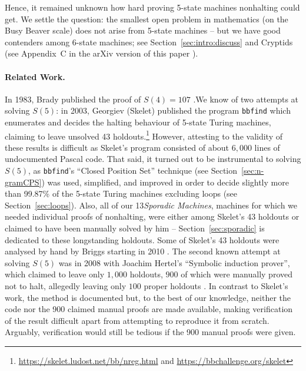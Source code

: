 \documentclass[sigconf,screen]{acmart}
\theoremstyle{definition} %
\numberwithin{equation}{section}
\theoremstyle{definition} %
\newcommand{\ts}[1]{{\color{red}#1}}
\newcommand{\BBtheFourth}{107}
\newcommand{\numSporadic}{13\xspace}
\begin{document}
\enlargethispage{\baselineskip}
Hence, it remained unknown how hard proving 5-state machines nonhalting could get. We settle the question: the smallest open problem in mathematics (on the Busy Beaver scale) does not arise from 5-state machines -- but we have good contenders among 6-state machines; see Section~\ref{sec:intro:discuss} and Cryptids (see Appendix~C in the arXiv version of this paper \cite{BB5}).

\newcommand{\SkeletHoldoutsSporadic}{\ts{XX}\xspace}

\paragraph{Related Work.} In 1983, Brady published the proof of $S(4) = \BBtheFourth$ \cite{Brady83}.We know of two attempts at solving $S(5)$: in 2003, Georgiev (Skelet) published the program \texttt{bbfind} \cite{Skelet_bbfind} which enumerates and decides the halting behaviour of 5-state Turing machines, claiming to leave unsolved 43 holdouts.\footnote{\url{https://skelet.ludost.net/bb/nreg.html} and \url{https://bbchallenge.org/skelet}} However, attesting to the validity of these results is difficult as Skelet's program consisted of about $6{,}000$ lines of undocumented Pascal code. That said, it turned out to be instrumental to solving $S(5)$, as \texttt{bbfind}'s ``Closed Position Set'' technique (see Section~\ref{sec:n-gramCPS}) was used, simplified, and improved in order to decide slightly more than 99.87\% of the 5-state Turing machines excluding loops (see Section~\ref{sec:loops}). Also, all of our \numSporadic \textit{Sporadic Machines}, \ie machines for which we needed individual proofs of nonhalting, were either among Skelet's 43 holdouts or claimed to have been manually solved by him -- Section~\ref{sec:sporadic} is dedicated to these longstanding holdouts. Some of Skelet's 43 holdouts were analysed by hand by Briggs starting in 2010 \cite{DanBriggs}. The second known attempt at solving $S(5)$ was in 2008 with Joachim Hertel's ``Symbolic induction prover'', which claimed to leave only $1{,}000$ holdouts, $900$ of which were manually proved not to halt, allegedly leaving only $100$ proper holdouts \cite{Hertel}. In contrast to Skelet's work, the method is documented but, to the best of our knowledge, neither the code nor the 900 claimed manual proofs are made available, making verification of the result difficult apart from attempting to reproduce it from scratch. Arguably, verification would still be tedious if the 900 manual proofs were given.
\end{document}
